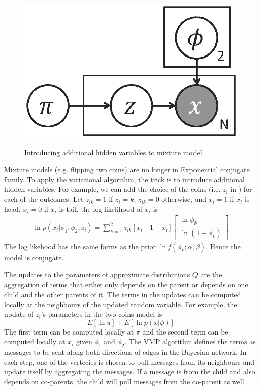 \begin{figure}[h]
	\includegraphics[scale=0.5]{figs/two_coins_latent.eps}
	\label{fig:two_coins_latent}
	\caption{Introducing additional hidden variables to mixture model}
\end{figure}

Mixture models (e.g. flipping two coins) are no longer in Exponential conjugate
family. To apply the variational algorithm, the trick is to introduce
additional hidden variables. For example, we can add the choice of the coins
(i.e. $z_i$ in ) for each of the outcomes. Let
$z_{ik} = 1$ if $z_i = k$, $z_{ik} = 0$ otherwise, and $x_{i} = 1$ if $x_i$ is
head, $x_{i} = 0$ if $x_i$ is tail, the log likelihood of
$x_i$ is 
\begin{align*}
	\ln p(x_i|\phi_1, \phi_2, z_i) = \sum_{k=1}^2 z_{ik} [x_{i} \quad 1-x_{i}]
\begin{bmatrix} \ln \phi_k \\ \ln (1-\phi_k) \end{bmatrix}
\end{align*}
The log likehood has the same forms as the prior $\ln f(\phi_k; \alpha, \beta)$.
Hence the model is conjugate.

The updates to the parameters of approximate distributions $Q$
are the aggregation of terms that either only depends on the parent or depends
on one child and the other parents of it. The terms in the updates can be
computed locally at the neighbours of the updated random variable.  For
example, the update of $z_i$'s parameters in the
two coins model is
\begin{equation}
	E[\ln \pi] + E[\ln p(x|\phi)]
\end{equation}
The first term can be computed locally at $\pi$ and the second term can be
computed locally at $x_i$ given $\phi_1$ and $\phi_2$.  The VMP algorithm
defines the terms as messages to be sent along both directions of edges in the
Bayesian network. In each step, one of the vertecies is chosen to pull
messages from its neighbours and update itself by aggregating the messages.
If a message is from the child and also depends on co-parents, the child will
pull messages from the co-parent as well. 
